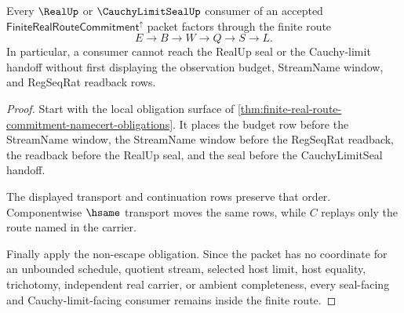 \begin{theorem}
\label{thm:finite-real-route-commitment-budget-nonescape}
Every $\RealUp$ or $\CauchyLimitSealUp$ consumer of an accepted $\mathsf{FiniteRealRouteCommitment}^{\uparrow}$ packet factors through the finite route
$$
E \to B \to W \to Q \to S \to L .
$$
In particular, a consumer cannot reach the RealUp seal or the Cauchy-limit handoff without first displaying the observation budget, StreamName window, and RegSeqRat readback rows.
\end{theorem}
\begin{proof}
Start with the local obligation surface of \autoref{thm:finite-real-route-commitment-namecert-obligations}. It places the budget row before the StreamName window, the StreamName window before the RegSeqRat readback, the readback before the RealUp seal, and the seal before the CauchyLimitSeal handoff.

The displayed transport and continuation rows preserve that order. Componentwise $\hsame$ transport moves the same rows, while $C$ replays only the route named in the carrier.

Finally apply the non-escape obligation. Since the packet has no coordinate for an unbounded schedule, quotient stream, selected host limit, host equality, trichotomy, independent real carrier, or ambient completeness, every seal-facing and Cauchy-limit-facing consumer remains inside the finite route.
\end{proof}




